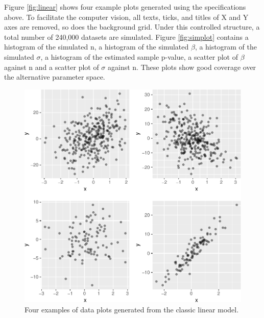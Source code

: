 \documentclass[12pt]{article}
\begin{document}
Figure \ref{fig:linear} shows four example plots generated using the
specifications above. To facilitate the computer vision, all texts,
ticks, and titles of X and Y axes are removed, so does the background
grid. Under this controlled structure, a total number of 240,000
datasets are simulated. Figure \ref{fig:simplot} contains a histogram of
the simulated n, a histogram of the simulated \(\beta\), a histogram of
the simulated \(\sigma\), a histogram of the estimated sample p-value, a
scatter plot of \(\beta\) against n and a scatter plot of \(\sigma\)
against n. These plots show good coverage over the alternative parameter
space.

\begin{figure}
\centering
\includegraphics{pc_plots_files/figure-latex/linear-1.pdf}
\caption{Four examples of data plots generated from the classic linear
model.}
\end{figure}
\end{document}
